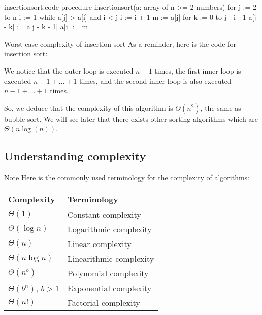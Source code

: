 \documentclass[a4paper]{article}
\begin{document}
\begin{filecontents*}[overwrite]{insertionsort.code}
procedure insertionsort(a: array of n >= 2 numbers)
    for j := 2 to n
        i := 1
        while a[j] > a[i] and i < j
            i := i + 1
        m := a[j]
        for k := 0 to j - i - 1
            a[j - k] := a[j - k - 1]
        a[i] := m
\end{filecontents*}


\begin{parag}{Worst case complexity of insertion sort}
    As a reminder, here is the code for insertion sort:

    We notice that the outer loop is executed $n - 1$ times, the first inner loop is executed $n-1 + \ldots + 1$ times, and the second inner loop is also executed $n - 1 + \ldots + 1$ times.

    So, we deduce that the complexity of this algorithm is $\Theta\left(n^2\right)$, the same as bubble sort. We will see later that there exists other sorting algorithms which are $\Theta\left(n \log\left(n\right)\right)$.
\end{parag}

\subsection{Understanding complexity}
\begin{parag}{Note}
    Here is the commonly used terminology for the complexity of algorithms:
    \begin{center}
        \begin{tabular}{|ll|}
            \hline
            \textbf{Complexity} & \textbf{Terminology}  \\
            \hline
            $\Theta\left(1\right)$ & Constant complexity  \\
            $\Theta\left(\log n\right)$ & Logarithmic complexity  \\
            $\Theta\left(n\right)$ & Linear complexity  \\
            $\Theta\left(n\log n\right)$ & Linearithmic complexity  \\
            $\Theta\left(n^b\right)$ & Polynomial complexity  \\
            $\Theta\left(b^n\right)$, $b > 1$ & Exponential complexity \\
            $\Theta\left(n!\right)$ & Factorial complexity \\
            \hline
        \end{tabular}
    \end{center}
\end{parag}
\end{document}
